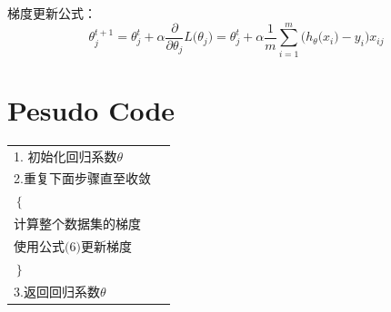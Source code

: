 \documentclass{ctexart}
\begin{document}
\begin{description}
梯度更新公式：
\begin{equation}
\theta_j^{t+1}=\theta_j^t+\alpha\frac{\partial}{\partial \theta_j}L\big(\theta_j\big)=\theta_j^t+\alpha\frac{1}{m}\sum_{i=1}^{m}\big(h_\theta\big(x_i\big)-y_i\big)x_{ij}
\end{equation}

\end{description} 

 

\section{Pesudo Code}

\begin{tabular}{ll}
1. 初始化回归系数$\theta$\\
2.重复下面步骤直至收敛\\
\quad$ \left\{ \right.$ \\
\quad \quad 计算整个数据集的梯度\\
\quad \quad 使用公式$\big(6\big)$更新梯度\\
\quad $\left. \right\}$ \\
3.返回回归系数$\theta$

\end{tabular}
%
\end{document}

